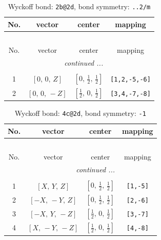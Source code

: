 \documentclass[fleqn,8pt]{jsarticle}
\begin{document}
\renewcommand{\arraystretch}{1.2}
\begin{longtable}{cccc}
\caption{Wyckoff bond: {\tt 2b@2d}, bond symmetry: {\tt ..2/m}}
 \\
 \hline \hline
No. & vector & center & mapping \\ \hline \endfirsthead

\multicolumn{3}{l}{\tablename\ \thetable{}} \\
 \hline \hline
No. & vector & center & mapping \\ \hline \endhead

 \hline \hline
\multicolumn{3}{r}{\footnotesize\it continued ...} \\ \endfoot

 \hline \hline
\multicolumn{3}{r}{} \\ \endlastfoot

1 & $\left[ 0,\, 0,\, Z \right]$ & $\left[ 0,\, \frac{1}{2},\, \frac{1}{2} \right]$ & {\tt [1,2,-5,-6]} \\ \hline
2 & $\left[ 0,\, 0,\, - Z \right]$ & $\left[ \frac{1}{2},\, 0,\, \frac{1}{2} \right]$ & {\tt [3,4,-7,-8]} \\
\end{longtable}
\renewcommand{\arraystretch}{1.2}
\begin{longtable}{cccc}
\caption{Wyckoff bond: {\tt 4c@2d}, bond symmetry: {\tt -1}}
 \\
 \hline \hline
No. & vector & center & mapping \\ \hline \endfirsthead

\multicolumn{3}{l}{\tablename\ \thetable{}} \\
 \hline \hline
No. & vector & center & mapping \\ \hline \endhead

 \hline \hline
\multicolumn{3}{r}{\footnotesize\it continued ...} \\ \endfoot

 \hline \hline
\multicolumn{3}{r}{} \\ \endlastfoot

1 & $\left[ X,\, Y,\, Z \right]$ & $\left[ 0,\, \frac{1}{2},\, \frac{1}{2} \right]$ & {\tt [1,-5]} \\ \hline
2 & $\left[ - X,\, - Y,\, Z \right]$ & $\left[ 0,\, \frac{1}{2},\, \frac{1}{2} \right]$ & {\tt [2,-6]} \\ \hline
3 & $\left[ - X,\, Y,\, - Z \right]$ & $\left[ \frac{1}{2},\, 0,\, \frac{1}{2} \right]$ & {\tt [3,-7]} \\ \hline
4 & $\left[ X,\, - Y,\, - Z \right]$ & $\left[ \frac{1}{2},\, 0,\, \frac{1}{2} \right]$ & {\tt [4,-8]} \\
\end{longtable}
\end{document}
